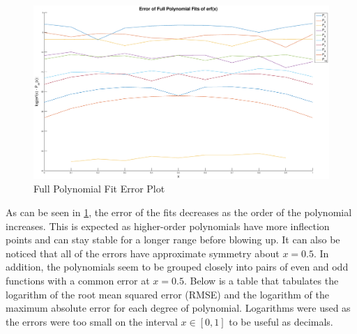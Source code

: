 \documentclass[10pt,a4paper]{article}
\begin{document}
\begin{multicols*}{2}
\begin{figure}[H]
\includegraphics[width=\columnwidth]{Figures/fullpolyerror.eps}
\caption{Full Polynomial Fit Error Plot}
\label{fig: fullerror}
\end{figure}

As can be seen in \cref{fig: fullerror}, the error of the fits decreases as the order of the polynomial increases. This is expected as higher-order polynomials have more inflection points and can stay stable for a longer range before blowing up. It can also be noticed that all of the errors have approximate symmetry about $x=0.5$. In addition, the polynomials seem to be grouped closely into pairs of even and odd functions with a common error at $x=0.5$. Below is a table that tabulates the logarithm of the root mean squared error (RMSE) and the logarithm of the maximum absolute error for each degree of polynomial. Logarithms were used as the errors were too small on the interval $x \in [0,1]$ to be useful as decimals.


\end{multicols*}
\end{document}
